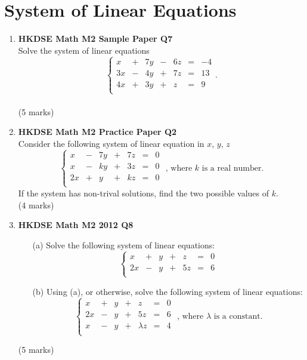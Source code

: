 \documentclass{report}
\begin{document}
\chapter{System of Linear Equations}
\begin{enumerate}
	\item \textbf{HKDSE Math M2 Sample Paper Q7}\\
	Solve the system of linear equations
	$$\left\{\begin{matrix}
		x & + & 7y & - & 6z & = & -4\\
		3x & - & 4y & + & 7z & = & 13\\
		4x & + & 3y & + & z & = & 9\\
	\end{matrix}\right..$$ \\(5 marks)

	\item \textbf{HKDSE Math M2 Practice Paper Q2}\\
	Consider the following system of linear equation in $x$, $y$, $z$
	$$\left\{\begin{matrix}
		x & - & 7y & + & 7z & = & 0\\
		x & - & ky & + & 3z & = & 0\\
		2x & + & y & + & kz & = & 0\\
	\end{matrix}\right.\text{ , where }k\text{ is a real number.}$$
	If the system has non-trival solutions, find the two possible values of $k$. \\(4 marks)

	\item \textbf{HKDSE Math M2 2012 Q8}
	\begin{enumerate}
		\item [(a)]Solve the following system of linear equations:
		$$\left\{\begin{matrix}
			x & + & y & + & z & = & 0\\
			2x & - & y & + & 5z & = & 6\\
		\end{matrix}\right.$$
		\item [(b)]Using (a), or otherwise, solve the following system of linear equations: 
		$$\left\{\begin{matrix}
			x & + & y & + & z & = & 0\\
			2x & - & y & + & 5z & = & 6\\
			x & - & y & + & \lambda z & = & 4\\
		\end{matrix}\right.\text{ , where }\lambda\text{ is a constant.}$$ 
	\end{enumerate}
	(5 marks)


\end{enumerate}
\end{document}
